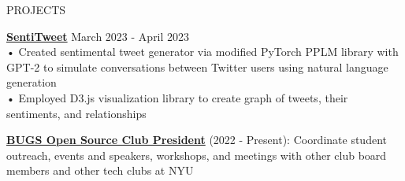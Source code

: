 \documentclass{resume} %
\begin{document}
\begin{rSection}{PROJECTS}

\textbf {\href{https://github.com/aminoa/sentitweet/}{SentiTweet}} \hfill March 2023 - April 2023 \\
• Created sentimental tweet generator via modified PyTorch PPLM library with GPT-2 to simulate conversations between Twitter users using natural language generation\\
• Employed D3.js visualization library to create graph of tweets, their sentiments, and relationships 




\textbf{\href{https://bugs-nyu.github.io/}{BUGS Open Source Club President}} (2022 - Present): Coordinate student outreach, events and speakers, workshops, and meetings with other club board members and other tech clubs at NYU\\

\end{rSection}
\end{document}
